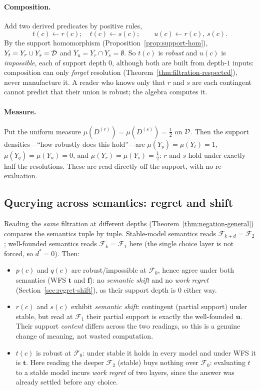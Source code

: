 \paragraph{Composition.}
Add two derived predicates by positive rules,
\[
  t(c) \leftarrow r(c); \quad t(c) \leftarrow s(c);
  \qquad u(c) \leftarrow r(c),\, s(c).
\]
By the support homomorphism (Proposition~\ref{prop:support-hom}),
$Y_t = Y_r \cup Y_s = \mathcal{D}$ and $Y_u = Y_r \cap Y_s = \emptyset$. So $t(c)$ is
\emph{robust} and $u(c)$ is \emph{impossible}, each of support depth $0$,
although both are built from depth-$1$ inputs: composition can only
\emph{forget} resolution (Theorem~\ref{thm:filtration-respected}), never
manufacture it. A reader who knows only that $r$ and $s$ are each contingent
cannot predict that their union is robust; the algebra computes it.

\paragraph{Measure.}
Put the uniform measure $\mu(D^{(r)}) = \mu(D^{(s)}) = \tfrac12$ on $\mathcal{D}$.
Then the support densities---``how robustly does this hold''---are
$\mu(Y_p) = \mu(Y_t) = 1$, $\mu(Y_q) = \mu(Y_u) = 0$, and
$\mu(Y_r) = \mu(Y_s) = \tfrac12$: $r$ and $s$ hold under exactly half the
resolutions. These are read directly off the support, with no re-evaluation.

\subsection{Querying across semantics: regret and shift}

Reading the \emph{same} filtration at different depths
(Theorem~\ref{thm:negation-general}) compares the semantics tuple by tuple.
Stable-model semantics reads $\mathcal{F}_{k+d} = \mathcal{F}_2$; well-founded
semantics reads $\mathcal{F}_{k} = \mathcal{F}_1$ here (the single choice layer
is not forced, so $d^\ast = 0$). Then:
\begin{itemize}[nosep,leftmargin=*]
  \item $p(c)$ and $q(c)$ are robust/impossible at $\mathcal{F}_0$, hence agree
        under both semantics (WFS $\mathbf{t}$ and $\mathbf{f}$): no
        \emph{semantic shift} and no \emph{work regret}
        (Section~\ref{sec:regret-shift}), as their support depth is $0$ either
        way.
  \item $r(c)$ and $s(c)$ exhibit \emph{semantic shift}: contingent (partial
        support) under stable, but read at $\mathcal{F}_1$ their partial support
        is exactly the well-founded $\mathbf{u}$. Their support \emph{content}
        differs across the two readings, so this is a genuine change of meaning,
        not wasted computation.
  \item $t(c)$ is robust at $\mathcal{F}_0$: under stable it holds in every
        model and under WFS it is $\mathbf{t}$. Here reading the deeper
        $\mathcal{F}_2$ (stable) buys nothing over $\mathcal{F}_0$: evaluating
        $t$ to a stable model incurs \emph{work regret} of two layers, since the
        answer was already settled before any choice.
\end{itemize}

